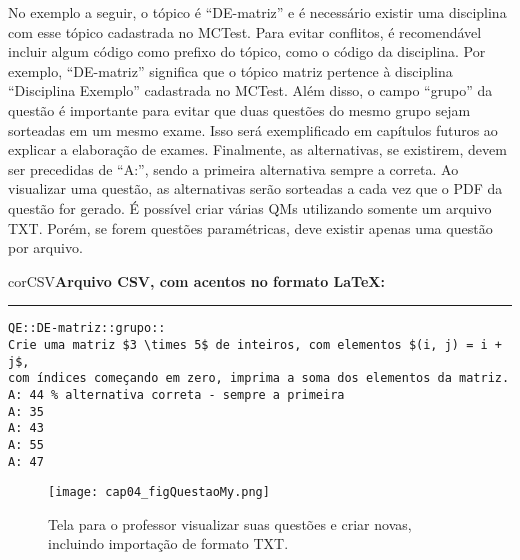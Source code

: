 No exemplo a seguir, o tópico é ``DE-matriz'' e é necessário existir uma disciplina com esse tópico cadastrada no MCTest. Para evitar conflitos, é recomendável incluir algum código como prefixo do tópico, como o código da disciplina. Por exemplo, ``DE-matriz'' significa que o tópico matriz pertence à disciplina ``Disciplina Exemplo'' cadastrada no MCTest. Além disso, o campo ``grupo'' da questão é importante para evitar que duas questões do mesmo grupo sejam sorteadas em um mesmo exame. Isso será exemplificado em capítulos futuros ao explicar a elaboração de exames. Finalmente, as alternativas, se existirem, devem ser precedidas de ``A:'', sendo a primeira alternativa sempre a correta. Ao visualizar uma questão, as alternativas serão sorteadas a cada vez que o PDF da questão for gerado. É possível criar várias QMs utilizando somente um arquivo TXT. Porém, se forem questões paramétricas, deve existir apenas uma questão por arquivo.

\begin{myboxCode}{corCSV}{\textbf{Arquivo CSV, com acentos no formato \LaTeX: }}\vspace{3mm}
\hrule
\begin{verbatim}
QE::DE-matriz::grupo:: 
Crie uma matriz $3 \times 5$ de inteiros, com elementos $(i, j) = i + j$, 
com índices começando em zero, imprima a soma dos elementos da matriz.
A: 44 % alternativa correta - sempre a primeira
A: 35
A: 43
A: 55
A: 47
\end{verbatim}
\end{myboxCode}

\begin{figure}[!ht]
  \centering
  \texttt{[image: cap04\_figQuestaoMy.png]}
  \caption{Tela para o professor visualizar suas questões e criar novas, incluindo importação de formato TXT.}
  \label{fig:cap04_figQuestaoMy}
\end{figure}


